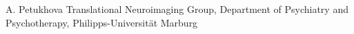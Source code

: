 
                {A. Petukhova}
                {Translational Neuroimaging Group, Department of Psychiatry and Psychotherapy, Philipps-Universität Marburg}
                